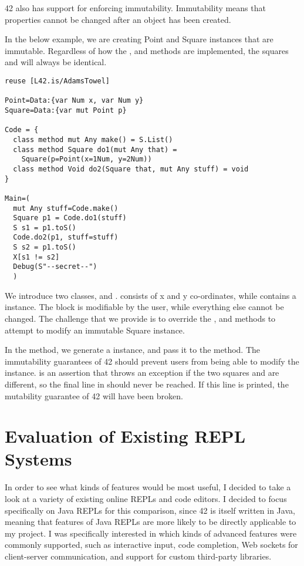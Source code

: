 42 also has support for enforcing immutability. Immutability means that properties cannot be changed after an object has been created.

In the below example, we are creating Point and Square instances that are immutable. Regardless of how the ,  and  methods are implemented, the squares  and  will always be identical.

\begin{lstlisting}[caption=Immutability]
reuse [L42.is/AdamsTowel]

Point=Data:{var Num x, var Num y}
Square=Data:{var mut Point p}

Code = {
  class method mut Any make() = S.List()
  class method Square do1(mut Any that) =
    Square(p=Point(x=1Num, y=2Num))
  class method Void do2(Square that, mut Any stuff) = void
}

Main=(
  mut Any stuff=Code.make()
  Square p1 = Code.do1(stuff)
  S s1 = p1.toS()
  Code.do2(p1, stuff=stuff)
  S s2 = p1.toS()
  X[s1 != s2]
  Debug(S"--secret--")
  )
\end{lstlisting}

We introduce two classes,  and .  consists of x and y co-ordinates, while  contains a  instance. The  block is modifiable by the user, while everything else cannot be changed. The challenge that we provide is to override the ,  and  methods to attempt to modify an immutable Square instance.

In the  method, we generate a  instance, and pass it to the  method. The immutability guarantees of 42 should prevent users from being able to modify the  instance.  is an assertion that throws an exception if the two squares  and  are different, so the final line in  should never be reached. If this line is printed, the mutability guarantee of 42 will have been broken.

\chapter{Evaluation of Existing REPL Systems}

In order to see what kinds of features would be most useful, I decided to take a look at a variety of existing online REPLs and code editors. I decided to focus specifically on Java REPLs for this comparison, since 42 is itself written in Java, meaning that features of Java REPLs are more likely to be directly applicable to my project. I was specifically interested in which kinds of advanced features were commonly supported, such as interactive input, code completion, Web sockets for client-server communication, and support for custom third-party libraries.


